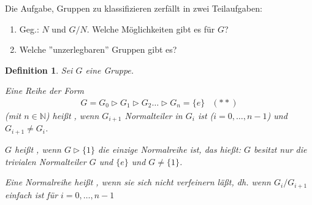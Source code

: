 \documentclass[a4paper,10pt,german]{scrbook}
\theoremstyle{saetze}
\theoremstyle{definitionen}
\newtheorem{Def}{Definition}[section]
\begin{document}
%  

Die Aufgabe, Gruppen zu klassifizieren zerfällt in zwei
Teilaufgaben:
\begin{enumerate}
\renewcommand{\labelenumi}{(\theenumi)}
\item Geg.: $N$ und $G/N$. Welche Möglichkeiten gibt es für $G$?
\item Welche ''unzerlegbaren'' Gruppen gibt es?
\end{enumerate}

\begin{Def}
Sei $G$ eine Gruppe.
\begin{enum}
\item Eine Reihe der Form
\[\begin{array}{lr} G = G_0 \triangleright G_1 \triangleright G_2
\dots \triangleright G_n = \{e\} & (\ast \ast) \end{array}\] (mit $n \in \mathbb{N}$) heißt , wenn $G_{i+1}$
Normalteiler in $G_i$ ist ($i=0,\dots,n-1$) und $G_{i+1} \neq G_i$.
\item $G$ heißt , wenn $G\triangleright \{1\}$ die einzige Normalreihe ist, das hießt: $G$ besitzt nur die trivialen
Normalteiler $G$ und $\{e\}$ und $G\ne \{1\}$.
\item Eine Normalreihe heißt , wenn sie sich
nicht verfeinern läßt, dh. wenn $G_i/G_{i+1}$ einfach ist für
$i=0,\dots,n-1$
\end{enum}
\end{Def}
\end{document}
